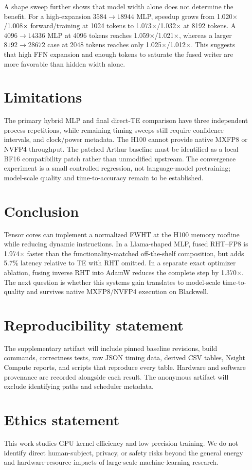 \documentclass{article}
\begin{document}
A shape sweep further shows that model width alone does not determine the
benefit. For a high-expansion $3584\rightarrow18944$ MLP, speedup grows from
1.020$\times$/1.008$\times$ forward/training at 1024 tokens to
1.073$\times$/1.032$\times$ at 8192 tokens. A $4096\rightarrow14336$ MLP at
4096 tokens reaches 1.059$\times$/1.021$\times$, whereas a larger
$8192\rightarrow28672$ case at 2048 tokens reaches only
1.025$\times$/1.012$\times$. This suggests that high FFN expansion and enough
tokens to saturate the fused writer are more favorable than hidden width alone.

\section{Limitations}
The primary hybrid MLP and final direct-TE comparison have three independent
process repetitions, while remaining timing sweeps still require confidence
intervals, and clock/power metadata. The H100 cannot provide native MXFP8 or NVFP4 throughput.
The patched Arthur baseline must be identified as a local BF16 compatibility
patch rather than unmodified upstream. The convergence experiment is a small
controlled regression, not language-model pretraining; model-scale quality and
time-to-accuracy remain to be established.


\section{Conclusion}
Tensor cores can implement a normalized FWHT at the H100 memory roofline while
reducing dynamic instructions. In a Llama-shaped MLP, fused RHT--FP8 is
1.974$\times$ faster than the functionality-matched off-the-shelf composition,
but adds 5.7\% latency relative to TE with RHT omitted. In a separate exact
optimizer ablation, fusing inverse RHT into AdamW reduces the complete step by
1.370$\times$.
The next question is whether this systems gain translates to model-scale
time-to-quality and survives native MXFP8/NVFP4 execution on Blackwell.




\section*{Reproducibility statement}
The supplementary artifact will include pinned baseline revisions, build
commands, correctness tests, raw JSON timing data, derived CSV tables, Nsight
Compute reports, and scripts that reproduce every table. Hardware and software
provenance are recorded alongside each result. The anonymous artifact will
exclude identifying paths and scheduler metadata.

\section*{Ethics statement}
This work studies GPU kernel efficiency and low-precision training. We do not
identify direct human-subject, privacy, or safety risks beyond the general
energy and hardware-resource impacts of large-scale machine-learning research.
\end{document}
